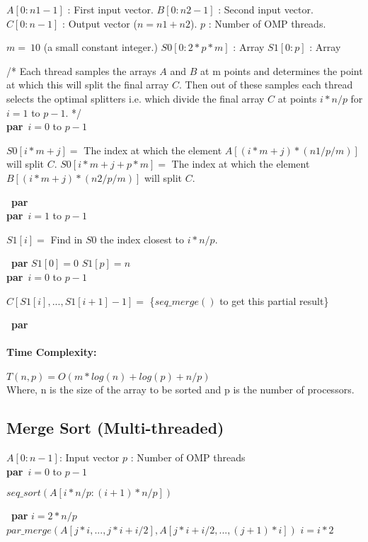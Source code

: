 \documentclass[11pt]{article}
\makeatletter
\newcommand\LONGCOMMENT[1]{\textcolor{OliveGreen}{/* #1 */}}
\newcommand\PARFOR[1]{\hspace{20 mm}\\\textbf{par}\algorithmicfor\ {#1}\ \algorithmicdo\\\begin{ALC@for}}
\newcommand\ENDPARFOR{\end{ALC@for}\algorithmicend\ \textbf{par}\algorithmicfor}
\makeatother
\begin{document}
\begin{algorithm}[H]
\caption{$ParMerge (Multi-threaded)$}
\label{par_merge}
\begin{algorithmic}
  \STATE $A[0 : n1-1]$ : First input vector.
  \STATE $B[0 : n2-1]$ : Second input vector.
  \STATE $C[0 : n-1 ]$ : Output vector ($n=n1+n2$).
  \STATE $p$ : Number of OMP threads.

  \STATE $m=~10$ (a small constant integer.)
  \STATE $S0[0:2*p*m]$ : Array
  \STATE $S1[0:p]$     : Array

  \STATE \LONGCOMMENT {Each thread samples the arrays $A$ and $B$ at m points and determines the point at which 
                   this will split the final array $C$. Then out of these samples each thread selects the 
                   optimal splitters i.e. which divide the final array $C$ at points $i*n/p$ for $i=1$ to $p-1$.}
  \PARFOR {$i=0$ to $p-1$}
      \STATE $S0[i*m+j]     = ${ The index at which the element $A[(i*m+j)*(n1/p/m)]$ will split $C$. }
      \STATE $S0[i*m+j+p*m] = ${ The index at which the element $B[(i*m+j)*(n2/p/m)]$ will split $C$. }
    \ENDFOR
  \ENDPARFOR
  \STATE {}
  \PARFOR {$i=1$ to $p-1$}
    \STATE $S1[i] = ${ Find in $S0$ the index closest to $i*n/p$. }
  \ENDPARFOR
  \STATE $S1[0]=0$
  \STATE $S1[p]=n$
  \STATE {}
  \PARFOR {$i=0$ to $p-1$}
    \STATE $C[ S1[i] , ... , S1[i+1]-1 ] = $ \{$seq\_merge()$ to get this partial result\}
  \ENDPARFOR

\end{algorithmic}
\end{algorithm}

\paragraph{Time Complexity:}
$T(n,p) = O(m*log(n) + log(p) + n/p)$\\
Where, n is the size of the array to be sorted and p is the number of 
processors.


\subsection{Merge Sort (Multi-threaded)}

\begin{algorithm}[H]
\caption{$MergeSort (Multi-threaded)$}
\label{merge_sort}
\begin{algorithmic}
  \STATE $A[0:n-1]$: Input vector 
  \STATE $p$       : Number of OMP threads
  \STATE {}
  \STATE {}
  \STATE {}
  \PARFOR {$i = 0$ to $p-1$}
    \STATE $seq\_sort(A[ {i*n/p} : {(i+1)*n/p} ])$
  \ENDPARFOR
  \STATE {}
  \STATE $i=2*n/p$
      \STATE $par\_merge( A[j*i, ... ,j*i+i/2] , A[j*i+i/2, ... ,(j+1)*i] )$
    \ENDFOR
  \STATE $i=i*2$
  \ENDWHILE
\end{algorithmic}
\end{algorithm}
\end{document}
